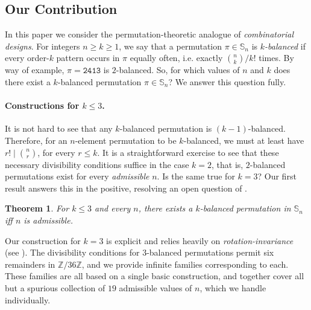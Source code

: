 \documentclass{article}
\newcommand{\Sn}{\mathbb{S}_n}
\theoremstyle{remark}
\theoremstyle{plain}
\newtheorem{thm}{Theorem}
\begin{document}
\subsection{Our Contribution}

In this paper we consider the permutation-theoretic analogue of \emph{combinatorial designs}.
For integers $n \ge k \ge 1$, we say that a permutation
$\pi \in \Sn$ is \emph{$k$-balanced}
if every order-$k$ pattern occurs in $\pi$ equally
often, i.e. exactly $\binom{n}{k}/k!$ times.
By way of example, $\pi = \mathtt{2413}$ is $2$-balanced. 
So, for which values of $n$ and $k$ does there exist a $k$-balanced permutation $\pi\in\mathbb{S}_{n}$? We answer this question fully.

\paragraph{Constructions for $k \le 3$.}
It is not hard to see that any $k$-balanced permutation is $(k-1)$-balanced.
Therefore, for an $n$-element permutation to be $k$-balanced, we must at least have $r! \mid \binom{n}{r}$, for every $r \le k$.
It is a straightforward exercise to see that these necessary divisibility conditions suffice in the case $k=2$,
that is, $2$-balanced permutations exist for every \textit{admissible} $n$. 
Is the same true for $k=3$?
Our first result answers this in the positive, resolving an open question of \cite{cooper2008symmetric}.

\begin{thm}
    \label{thm_intro_3balanced}
    For $k\leq 3$ and every $n$, there exists a $k$-balanced permutation in $\Sn$ iff $n$ is admissible.
\end{thm} 

Our construction for $k=3$ is explicit and relies heavily on \emph{rotation-invariance} (see ).
The divisibility conditions for $3$-balanced permutations permit six remainders in $\mathbb{Z}/36\mathbb{Z}$,
and we provide infinite families corresponding to each.
These families are all based on a single basic construction, and together cover all
but a spurious collection of $19$ admissible values of $n$, which we handle individually.
\end{document}
